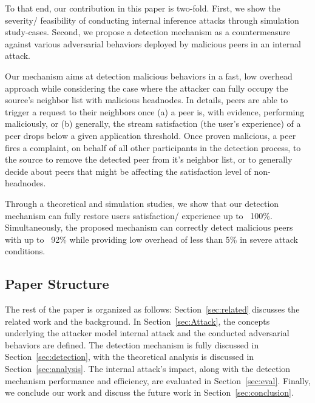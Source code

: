 To that end, our contribution in this paper is two-fold. 
First, we show the severity/ feasibility of conducting internal inference attacks through simulation study-cases.
Second, we propose a detection mechanism as a countermeasure against various adversarial behaviors deployed by malicious peers in an internal attack.

Our mechanism aims at detection malicious behaviors in a fast, low overhead approach while considering the case where the attacker can fully occupy the source's neighbor list with malicious headnodes.
In details, peers are able to trigger a request to their neighbors once (a) a peer is, with evidence, performing maliciously, or (b) generally, the stream satisfaction (the user's experience) of a peer drops below a given application threshold.
Once proven malicious, a peer fires a complaint, on behalf of all other participants in the detection process, to the source to remove the detected peer from it's neighbor list,
or to generally decide about peers that might be affecting the satisfaction level of non-headnodes.

Through a theoretical and simulation studies, we show that our detection mechanism can fully restore users satisfaction/ experience up to ~100\%.
Simultaneously, the proposed mechanism can correctly detect malicious peers with up to ~92\% while providing low overhead of less than 5\% in severe attack conditions.

\subsection*{Paper Structure}
The rest of the paper is organized as follows: Section~\ref{sec:related} discusses the related work and the background.
In Section~\ref{sec:Attack}, the concepts underlying the attacker model internal attack and the conducted adversarial behaviors are defined.
The detection mechanism is fully discussed in Section~\ref{sec:detection}, with the theoretical analysis is discussed in Section~\ref{sec:analysis}.
The internal attack's impact, along with the detection mechanism performance and efficiency, are evaluated in Section~\ref{sec:eval}. Finally, we conclude our work and discuss the future work in Section~\ref{sec:conclusion}.

 



